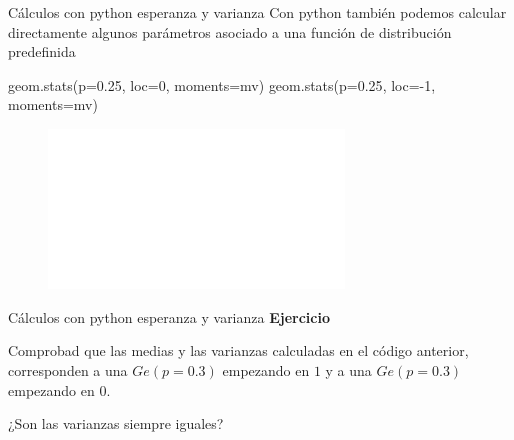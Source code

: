 \documentclass[
  ignorenonframetext,
  aspectratio=169]{beamer}
\newenvironment{Shaded}{\begin{snugshade}}{\end{snugshade}}
\newcommand{\DecValTok}[1]{\textcolor[rgb]{0.68,0.00,0.00}{#1}}
\newcommand{\FloatTok}[1]{\textcolor[rgb]{0.68,0.00,0.00}{#1}}
\newcommand{\NormalTok}[1]{\textcolor[rgb]{0.00,0.23,0.31}{#1}}
\newcommand{\OperatorTok}[1]{\textcolor[rgb]{0.37,0.37,0.37}{#1}}
\newcommand{\StringTok}[1]{\textcolor[rgb]{0.13,0.47,0.30}{#1}}
\begin{document}
\begin{frame}[fragile]{Cálculos con python esperanza y varianza}
\protect\hypertarget{cuxe1lculos-con-python-esperanza-y-varianza}{}
Con python también podemos calcular directamente algunos parámetros
asociado a una función de distribución predefinida

\begin{Shaded}
\begin{Highlighting}[]
\NormalTok{geom.stats(p}\OperatorTok{=}\FloatTok{0.25}\NormalTok{, loc}\OperatorTok{=}\DecValTok{0}\NormalTok{, moments}\OperatorTok{=}\StringTok{\textquotesingle{}mv\textquotesingle{}}\NormalTok{)}
\NormalTok{geom.stats(p}\OperatorTok{=}\FloatTok{0.25}\NormalTok{, loc}\OperatorTok{={-}}\DecValTok{1}\NormalTok{, moments}\OperatorTok{=}\StringTok{\textquotesingle{}mv\textquotesingle{}}\NormalTok{)}
\end{Highlighting}
\end{Shaded}

\begin{figure}

{\centering \includegraphics[width=0.7\textwidth,height=\textheight]{Tema_3_1_Notables_files/figure-beamer/py_mean_var_stats-13.pdf}

}

\end{figure}
\end{frame}

\begin{frame}{Cálculos con python esperanza y varianza}
\protect\hypertarget{cuxe1lculos-con-python-esperanza-y-varianza-1}{}
\textbf{Ejercicio}

Comprobad que las medias y las varianzas calculadas en el código
anterior, corresponden a una \(Ge(p=0.3)\) empezando en \(1\) y a una
\(Ge(p=0.3)\) empezando en \(0\).

¿Son las varianzas siempre iguales?
\end{frame}
\end{document}
